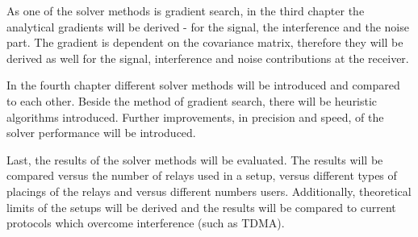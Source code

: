 As one of the solver methods is gradient search, in the third chapter the analytical gradients will be derived - for the signal, the interference and the noise part.
The gradient is dependent on the covariance matrix, therefore they will be derived as well for the signal, interference and noise contributions at the receiver.

In the fourth chapter different solver methods will be introduced and compared to each other.
Beside the method of gradient search, there will be heuristic algorithms introduced.
Further improvements, in precision and speed, of the solver performance will be introduced.

Last, the results of the solver methods will be evaluated.
The results will be compared versus the number of relays used in a setup,
versus different types of placings of the relays and versus different numbers users.
Additionally, theoretical limits of the setups will be derived and the results will be compared to current protocols which overcome interference (such as TDMA).








